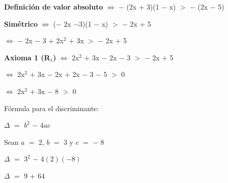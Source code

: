 \documentclass[12pt]{article}
\begin{document}
{\bfseries{Definición de valor absoluto}} \hspace{0.1cm} $\Longleftrightarrow$ \hspace{0.2cm} $-$ (2x $+$ 3)(1 $-$ x) $>$ $-$ (2x $-$ 5) \vspace{0.5cm}

\hspace{3cm} {\bfseries{Simétrico}} \hspace{.5cm} $\Longleftrightarrow$ \hspace{0.2cm} ($-$ 2x $-$3)(1 $-$ x) $>$ $-$ 2x $+$ 5 \vspace{0.5cm}

\hspace{5.6cm} $\Longleftrightarrow$ \hspace{0.2cm} $-$ 2x $-$ 3 $+$ 2x$^{2}$ $+$ 3x $>$ $-$ 2x $+$ 5 \vspace{0.5cm}

\hspace{2cm} {\bfseries{{\textcolor{carrotorange}{Axioma 1 (R$_{1}$)}}}} \hspace{.5cm} $\Longleftrightarrow$ \hspace{0.2cm} 2x$^{2}$ $+$ 3x $-$ 2x $-$ 3  $>$ $-$ 2x $+$ 5 \vspace{0.5cm}

\hspace{5.6cm} $\Longleftrightarrow$ \hspace{0.2cm} 2x$^{2}$ $+$ 3x $-$ 2x $+$ 2x $-$ 3 $-$ 5 $>$ $0$ \vspace{0.5cm}

\hspace{5.6cm} $\Longleftrightarrow$ \hspace{0.2cm} 2x$^{2}$ $+$ 3x $-$ 8 $>$ $0$ \vspace{0.5cm}

Fórmula para el discriminante:\vspace{0.5cm}

$\Delta$ $=$ $b^{2}$ $-$ 4$a$$c$ \vspace{0.2cm}

Sean $a$ $=$ 2, \hspace{0.3cm} $b$ $=$ 3 \hspace{0.3cm} y \hspace{0.3cm} $c$ $=$ $-$ 8 \vspace{0.3cm}

$\Delta$ $=$ $3^{2}$ $-$ 4$(2)$$(-8)$ \vspace{0.3cm}

$\Delta$ $=$ $9$ $+$ $64$ \vspace{0.3cm}
\end{document}
